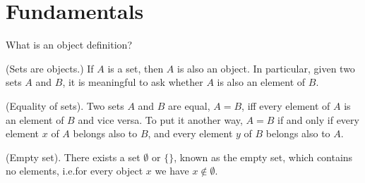 \section{Fundamentals}
{\color{red} What is an object definition?}
\begin{axiom}
    \textup{(Sets are objects.)} If $A$ is a set, then $A$ is also an object. In particular, given two sets $A$ and $B$, it is meaningful to ask whether $A$ is also an element of $B$. 
\end{axiom}
\begin{axiom}
    \textup{(Equality of sets).} Two sets $A$ and $B$ are equal, $A=B$, iff every element of $A$ is an element of $B$ and vice versa. To put it another way, $A=B$ if and only if every element $x$ of $A$ belongs also to $B$, and every element $y$ of $B$ belongs also to $A$.\label{ax:sets_equality}
\end{axiom}
 \begin{axiom}
    \textup{(Empty set).} There exists a set $\emptyset$ or $\{\}$, known as the empty set, which contains no elements, i.e.\@ for every object $x$ we have $x \notin \emptyset$.\label{ax:emptyset}
 \end{axiom}

